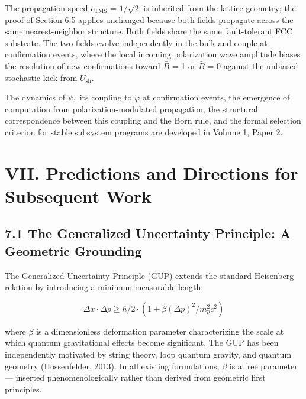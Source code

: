 \documentclass[11pt,oneside]{report}
\theoremstyle{definition}
\theoremstyle{remark}
\begin{document}
The propagation speed \ensuremath{c_{\mathrm{TMS}}} = \ensuremath{1/\sqrt{2}} is inherited from the lattice
geometry; the proof of Section 6.5 applies unchanged because both fields
propagate across the same nearest-neighbor structure. Both fields share
the same fault-tolerant FCC substrate. The two fields evolve
independently in the bulk and couple at confirmation events, where the
local incoming polarization wave amplitude biases the resolution of new
confirmations toward \ensuremath{\bar{B}} = 1 or \ensuremath{\bar{B}} = 0 against the unbiased stochastic kick
from \ensuremath{U_{\mathrm{sh}}.}

The dynamics of \ensuremath{\psi ,} its coupling to \ensuremath{\varphi} at confirmation events, the
emergence of computation from polarization-modulated propagation, the
structural correspondence between this coupling and the Born rule, and
the formal selection criterion for stable subsystem programs are
developed in Volume 1, Paper 2.

\section*{VII. Predictions and Directions for Subsequent Work}

\subsection*{7.1 The Generalized Uncertainty Principle: A Geometric Grounding}

The Generalized Uncertainty Principle (GUP) extends the standard
Heisenberg relation by introducing a minimum measurable length:

\begin{equation*}
\Delta x \cdot \Delta p \geq \hbar /2 \cdot (1 + \beta (\Delta p)^{2}/m^{2}_{p}c^{2})
\end{equation*}

where \ensuremath{\beta} is a dimensionless deformation parameter characterizing the
scale at which quantum gravitational effects become significant. The GUP
has been independently motivated by string theory, loop quantum gravity,
and quantum geometry (Hossenfelder, 2013). In all existing formulations,
\ensuremath{\beta} is a free parameter --- inserted phenomenologically rather than
derived from geometric first principles.
\end{document}
